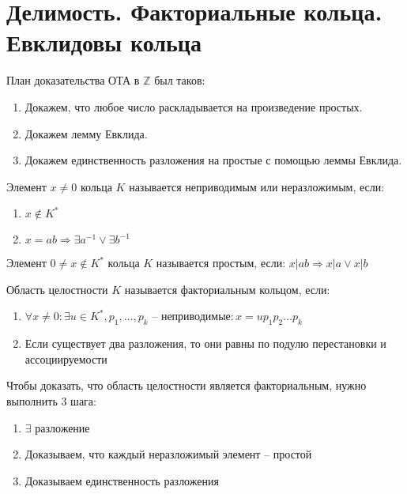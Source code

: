 \documentclass[document.tex]{subfiles}
\begin{document}
\section{Делимость. Факториальные кольца. Евклидовы кольца}

\begin{remark}
	План доказательства ОТА в $\mathbb{Z}$ был таков:
	\begin{enumerate}
		\item Докажем, что любое число раскладывается на произведение простых.
		\item Докажем лемму Евклида.
		\item Докажем единственность разложения на простые с помощью леммы Евклида.
	\end{enumerate}
\end{remark}

\begin{definition}
Элемент $x \neq 0$ кольца $K$ называется неприводимым или неразложимым, если:
\begin{enumerate}
\item $x \not \in K^*$
\item $x = ab \Rightarrow \exists a^{-1} \vee \exists b^{-1}$
\end{enumerate}
\end{definition}

\begin{definition}
Элемент $0 \neq x \not \in K^*$ кольца $K$ называется простым, если:
$x|ab \Rightarrow x|a \vee x|b$
\end{definition}

\begin{definition}
	Область целостности $K$ называется факториальным кольцом, если:
	\begin{enumerate}
		\item $\forall x \neq 0: \exists u \in K^*, p_1, \ldots, p_k \text{ -- неприводимые} : x = up_1p_2 \ldots p_k$
		\item Если существует два разложения, то они равны по подулю перестановки и ассоциируемости
	\end{enumerate}
\end{definition}

\begin{remark}
	Чтобы доказать, что область целостности является факториальным, нужно выполнить 3 шага:
	\begin{enumerate}
		\item $\exists$ разложение
		\item Доказываем, что каждый неразложимый элемент -- простой
		\item Доказываем единственность разложения
	\end{enumerate}
\end{remark}
\end{document}
